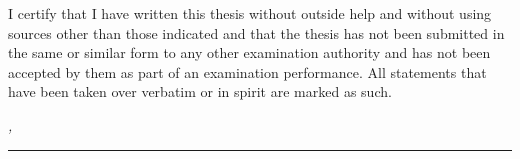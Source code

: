 %
\label{sec:declaration}
\thispagestyle{empty}

I certify that I have written this thesis without outside help and without using sources other than those indicated and that the thesis has not been submitted in the same or similar form to any other examination authority and has not been accepted by them as part of an examination performance. All statements that have been taken over verbatim or in spirit are marked as such.

\bigskip

\noindent\textit{\thesisUniversityCity, \thesisDate}

\smallskip

\begin{flushright}
	\begin{minipage}{5cm}
		\rule{\textwidth}{1pt}
		\centering\thesisName
	\end{minipage}
\end{flushright}

